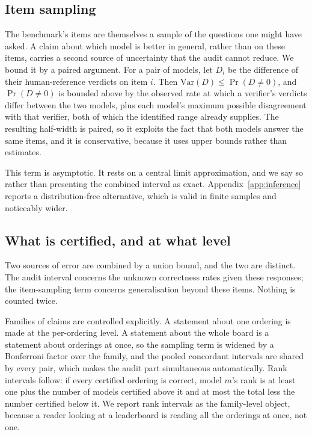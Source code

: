 \subsection{Item sampling}

The benchmark's \NumItems{} items are themselves a sample of the questions one might have
asked. A claim about which model is better in general, rather than on these items, carries a
second source of uncertainty that the audit cannot reduce. We bound it by a paired argument.
For a pair of models, let $D_i$ be the difference of their human-reference verdicts on item
$i$. Then $\mathrm{Var}(D) \le \Pr(D \neq 0)$, and $\Pr(D \neq 0)$ is bounded above by the
observed rate at which a verifier's verdicts differ between the two models, plus each model's
maximum possible disagreement with that verifier, both of which the identified range already
supplies. The resulting half-width is paired, so it exploits the fact that both models answer
the same items, and it is conservative, because it uses upper bounds rather than estimates.

This term is asymptotic. It rests on a central limit approximation, and we say so rather than
presenting the combined interval as exact. Appendix~\ref{app:inference} reports a
distribution-free alternative, which is valid in finite samples and noticeably wider.

\subsection{What is certified, and at what level}

Two sources of error are combined by a union bound, and the two are distinct. The audit
interval concerns the unknown correctness rates given these responses; the item-sampling term
concerns generalisation beyond these items. Nothing is counted twice.

Families of claims are controlled explicitly. A statement about one ordering is made at the
per-ordering level. A statement about the whole board is a statement about \NumOrderings{}
orderings at once, so the sampling term is widened by a Bonferroni factor over the family, and
the pooled concordant intervals are shared by every pair, which makes the audit part
simultaneous automatically. Rank intervals follow: if every certified ordering is correct,
model $m$'s rank is at least one plus the number of models certified above it and at most the
total less the number certified below it. We report rank intervals as the family-level object,
because a reader looking at a leaderboard is reading all the orderings at once, not one.

